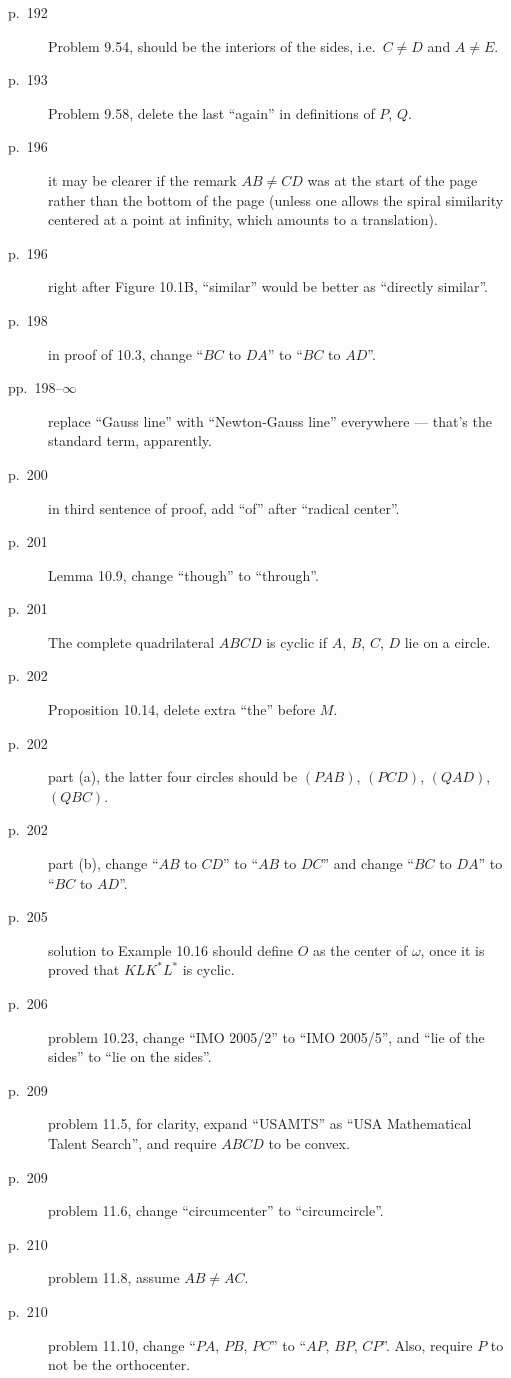 \documentclass[11pt]{scrartcl}
\begin{document}
\begin{description}
\item[p.\  192] Problem 9.54, should be the interiors of the sides, i.e.\ $C \neq D$ and $A \neq E$.
\item[p.\  193] Problem 9.58, delete the last ``again'' in definitions of $P$, $Q$.
\item[p.\  196] it may be clearer if the remark $AB \neq CD$ was at the
  start of the page rather than the bottom of the page
  (unless one allows the spiral similarity centered at a point at infinity,
  which amounts to a translation).
\item[p.\  196] right after Figure 10.1B, ``similar'' would be better as ``directly similar''.
\item[p.\  198] in proof of 10.3, change ``$BC$ to $DA$'' to ``$BC$ to $AD$''.
\item[pp.\  198--$\infty$] replace ``Gauss line'' with ``Newton-Gauss line''
  everywhere --- that's the standard term, apparently.
\item[p.\  200] in third sentence of proof, add ``of'' after ``radical center''.
\item[p.\  201] Lemma 10.9, change ``though'' to ``through''.
\item[p.\  201] The complete quadrilateral $ABCD$ is cyclic if $A$, $B$, $C$, $D$ lie on a circle.
\item[p.\  202] Proposition 10.14, delete extra ``the'' before $M$.
\item[p.\  202] part (a), the latter four circles should be
  $(PAB)$, $(PCD)$, $(QAD)$, $(QBC)$.
\item[p.\  202] part (b), change ``$AB$ to $CD$'' to ``$AB$ to $DC$''
  and change ``$BC$ to $DA$'' to ``$BC$ to $AD$''.
\item[p.\  205] solution to Example 10.16 should define $O$ as the center of $\omega$,
  once it is proved that $KL K^\ast L^\ast$ is cyclic.
\item[p.\  206] problem 10.23, change ``IMO 2005/2'' to ``IMO 2005/5'',
  and ``lie of the sides'' to ``lie on the sides''.
\item[p.\  209] problem 11.5, for clarity,
  expand ``USAMTS'' as ``USA Mathematical Talent Search'',
  and require $ABCD$ to be convex.
\item[p.\  209] problem 11.6, change ``circumcenter'' to ``circumcircle''.
\item[p.\  210] problem 11.8, assume $AB \neq AC$.
\item[p.\  210] problem 11.10, change ``$PA$, $PB$, $PC$'' to ``$AP$, $BP$, $CP$''.
  Also, require $P$ to not be the orthocenter.

\end{description}
\end{document}
